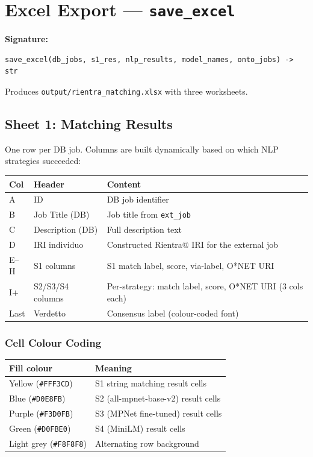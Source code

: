 ﻿\documentclass[12pt,a4paper]{article}
\begin{document}
\clearpage
\section{Excel Export --- \texttt{save\_excel}}

\textbf{Signature:}
\begin{lstlisting}
save_excel(db_jobs, s1_res, nlp_results, model_names, onto_jobs) -> str
\end{lstlisting}

Produces \texttt{output/rientra\_matching.xlsx} with three worksheets.

\subsection{Sheet 1: Matching Results}

One row per DB job. Columns are built dynamically based on which NLP strategies succeeded:

\begin{longtable}{@{}P{1cm}P{3cm}P{10.5cm}@{}}
\toprule
\textbf{Col} & \textbf{Header} & \textbf{Content} \\
\midrule
\endhead
A & ID & DB job identifier \\
B & Job Title (DB) & Job title from \texttt{ext\_job} \\
C & Description (DB) & Full description text \\
D & IRI individuo & Constructed Rientra@ IRI for the external job \\
E--H & S1 columns & S1 match label, score, via-label, O*NET URI \\
I$+$ & S2/S3/S4 columns & Per-strategy: match label, score, O*NET URI (3 cols each) \\
Last & Verdetto & Consensus label (colour-coded font) \\
\bottomrule
\end{longtable}

\subsubsection*{Cell Colour Coding}
\begin{longtable}{@{}P{4cm}P{10.5cm}@{}}
\toprule
\textbf{Fill colour} & \textbf{Meaning} \\
\midrule
\endhead
Yellow (\texttt{\#FFF3CD}) & S1 string matching result cells \\
Blue (\texttt{\#D0E8FB}) & S2 (all-mpnet-base-v2) result cells \\
Purple (\texttt{\#F3D0FB}) & S3 (MPNet fine-tuned) result cells \\
Green (\texttt{\#D0FBE0}) & S4 (MiniLM) result cells \\
Light grey (\texttt{\#F8F8F8}) & Alternating row background \\
\bottomrule
\end{longtable}
\end{document}
